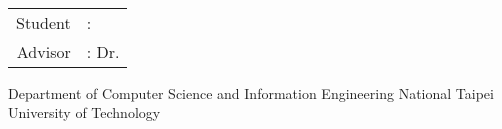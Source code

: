 \begin{titlepage}
	\begin{center}
		\LARGE
		\begin{singlespace}
			\textbf{\englishTitle{}} \\[0.5cm]
		\end{singlespace}
		
		\begin{singlespace}
			\begin{tabular}{r l}
				Student     & : \studentEnName{}  \\
				Advisor  & : Dr. \advisorEnName{} \\[0.5cm]
			\end{tabular}
		\end{singlespace}
		
		\begin{singlespace}
			Department of Computer Science
			and Information Engineering
			National Taipei University of Technology\\[0.5cm]
		\end{singlespace}
		
	\end{center}
\end{titlepage}